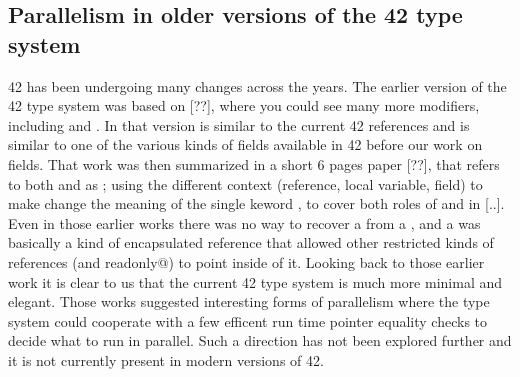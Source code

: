 \subsection*{Parallelism in older versions of the 42 type system}
42 has been undergoing many changes across the years.
The earlier version of the 42 type system was based on [??],
where you could see many more modifiers, including
\Q@fresh@ and \Q@baloon@.
In that version \Q@fresh@ is similar to the current 42 \Q@capsule@ references and \Q@baloon@ is similar to one of the various kinds of  \Q@capsule@ fields available in 42 before our work on \Q@rep@ fields.
That work was then summarized in a short 6 pages paper [??], that
refers to both \Q@fresh@ and \Q@baloon@ as \Q@baloon@; using the different context (reference, local variable, field) to make change the meaning of the single keword \Q@baloon@, to cover both roles of \Q@fresh@ and \Q@baloon@ in [..].
Even in those earlier works there was no way to recover a \Q@fresh@ from a \Q@baloon@, and a \Q@baloon@ was basically a kind of encapsulated reference that allowed other restricted kinds of references (\Q@external@ and \Q@external readonly@) to point inside of it. Looking back to those earlier work it is clear to us that the current 42 type system is much more minimal and elegant.
Those works suggested interesting forms of parallelism where the type system could cooperate with a few efficent run time pointer equality checks to decide what to run in parallel.
Such a direction has not been explored further and it is not currently present in modern versions of 42.
